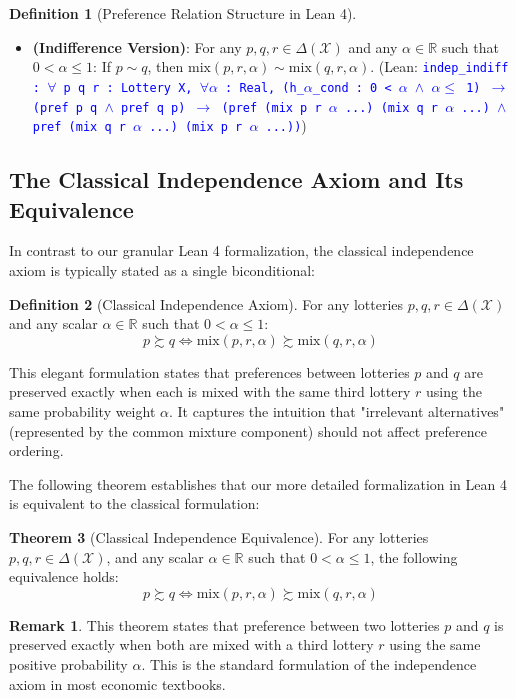 \documentclass{article}
\theoremstyle{definition}
\newtheorem{definition}{Definition}[section]
\newtheorem{theorem}[definition]{Theorem}
\newtheorem{remark}{Remark}[section]
\newcommand{\R}{\mathbb{R}}
\newcommand{\X}{\mathcal{X}}
\newcommand{\tactic}[1]{\textcolor{blue}{\texttt{#1}}}
\newcommand{\DeltaX}{\Delta(\X)} %
\newcommand{\pref}{\succsim} %
\newcommand{\indiff}{\sim} %
\newcommand{\mix}{\mathrm{mix}} %
\begin{document}
\begin{definition}[Preference Relation Structure in Lean 4]
\begin{description}
\begin{itemize}
        \item \textbf{(Indifference Version)}: For any $p, q, r \in \DeltaX$ and any $\alpha \in \R$ such that $0 < \alpha \le 1$: If $p \indiff q$, then $\mix(p, r, \alpha) \indiff \mix(q, r, \alpha)$.
        (Lean: \tactic{indep\_indiff : $\forall$ p q r : Lottery X, $\forall\alpha$ : Real, (h\_$\alpha$\_cond : 0 < $\alpha$ $\wedge$ $\alpha\leq$ 1) $\rightarrow$ (pref p q $\wedge$ pref q p) $\rightarrow$ (pref (mix p r $\alpha$ ...) (mix q r $\alpha$ ...) $\wedge$ pref (mix q r $\alpha$ ...) (mix p r $\alpha$ ...))})
    \end{itemize}
\end{description}
\end{definition}

\subsection{The Classical Independence Axiom and Its Equivalence}

In contrast to our granular Lean 4 formalization, the classical independence axiom is typically stated as a single biconditional:

\begin{definition}[Classical Independence Axiom]
For any lotteries $p, q, r \in \DeltaX$ and any scalar $\alpha \in \R$ such that $0 < \alpha \leq 1$:
\[ p \pref q \iff \mix(p, r, \alpha) \pref \mix(q, r, \alpha) \]
\end{definition}

This elegant formulation states that preferences between lotteries $p$ and $q$ are preserved exactly when each is mixed with the same third lottery $r$ using the same probability weight $\alpha$. It captures the intuition that "irrelevant alternatives" (represented by the common mixture component) should not affect preference ordering.

The following theorem establishes that our more detailed formalization in Lean 4 is equivalent to the classical formulation:

\begin{theorem}[Classical Independence Equivalence]\label{thm:classic_independence}
For any lotteries $p, q, r \in \DeltaX$, and any scalar $\alpha \in \R$ such that $0 < \alpha \le 1$, the following equivalence holds:
\[ p \pref q \iff \mix(p, r, \alpha) \pref \mix(q, r, \alpha) \]
\end{theorem}

\begin{remark}
This theorem states that preference between two lotteries $p$ and $q$ is preserved exactly when both are mixed with a third lottery $r$ using the same positive probability $\alpha$. This is the standard formulation of the independence axiom in most economic textbooks.
\end{remark}
\end{document}

